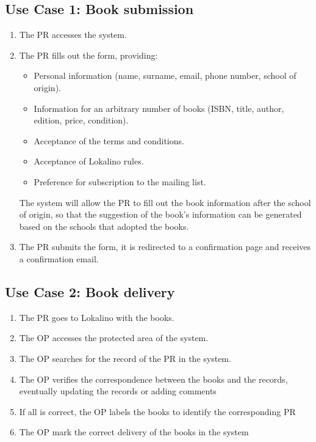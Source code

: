 \subsection{Use Case 1: Book submission}

\begin{enumerate}
    \item The PR accesses the system.
    \item The PR fills out the form, providing:
          \begin{itemize}
              \item Personal information (name, surname, email, phone number, school of origin).
              \item Information for an arbitrary number of books (ISBN, title, author, edition, price, condition).
              \item Acceptance of the terms and conditions.
              \item Acceptance of Lokalino rules.
              \item Preference for subscription to the mailing list.
          \end{itemize}
          The system will allow the PR to fill out the book information after the school of origin, so that the suggestion of the book's information can be generated based on the schools that adopted the books.
    \item The PR submits the form, it is redirected to a confirmation page and receives a confirmation email.
\end{enumerate}


\subsection{Use Case 2: Book delivery}

\begin{enumerate}
    \item The PR goes to Lokalino with the books.
    \item The OP accesses the protected area of the system.
    \item The OP searches for the record of the PR in the system.
    \item The OP verifies the correspondence between the books and the records, eventually updating the records or adding comments
    \item If all is correct, the OP labels the books to identify the corresponding PR
    \item The OP mark the correct delivery of the books in the system
\end{enumerate}

